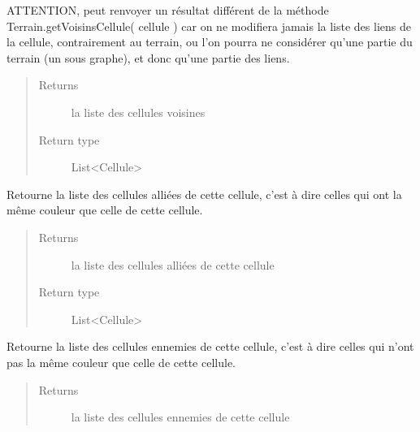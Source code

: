 \documentclass[letterpaper,10pt,english]{sphinxmanual}
\begin{document}
\begin{fulllineitems}
\begin{fulllineitems}
ATTENTION, peut renvoyer un résultat différent de la méthode Terrain.getVoisinsCellule( cellule )
car on ne modifiera jamais la liste des liens de la cellule, 
contrairement au terrain, ou l'on pourra ne considérer qu'une partie du terrain (un sous graphe), et donc qu'une partie des liens.
\begin{quote}\begin{description}
\item[{Returns}] \leavevmode
la liste des cellules voisines

\item[{Return type}] \leavevmode
List\textless{}Cellule\textgreater{}

\end{description}\end{quote}

\end{fulllineitems}


\begin{fulllineitems}
\label{index:Cellule.Cellule.getVoisinsAllies}
Retourne la liste des cellules alliées de cette cellule, c'est à dire celles qui ont la même couleur que celle de cette cellule.
\begin{quote}\begin{description}
\item[{Returns}] \leavevmode
la liste des cellules alliées de cette cellule

\item[{Return type}] \leavevmode
List\textless{}Cellule\textgreater{}

\end{description}\end{quote}

\end{fulllineitems}


\begin{fulllineitems}
\label{index:Cellule.Cellule.getVoisinsEnnemis}
Retourne la liste des cellules ennemies de cette cellule, c'est à dire celles qui n'ont pas la même couleur que celle de cette cellule.
\begin{quote}\begin{description}
\item[{Returns}] \leavevmode
la liste des cellules ennemies de cette cellule


\end{description}
\end{quote}
\end{fulllineitems}
\end{fulllineitems}
\end{document}
